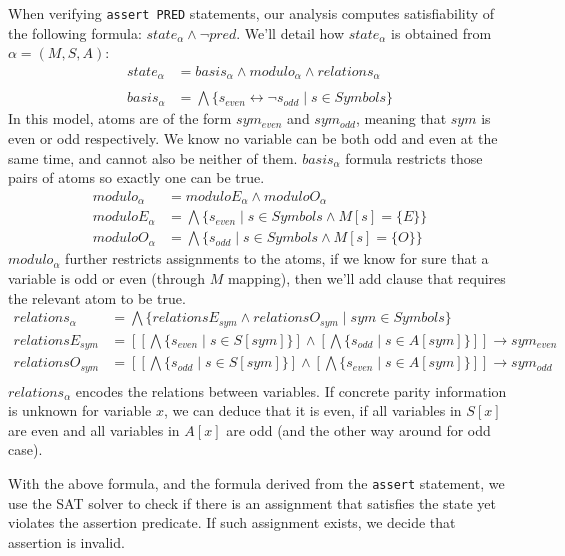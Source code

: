 When verifying \texttt{assert PRED} statements, our analysis computes satisfiability of the following formula: $state_\alpha\land\neg pred$. We'll detail how $state_\alpha$ is obtained from $\alpha = (M,S,A)$:
\begin{align*}
state_\alpha & = basis_\alpha \land modulo_\alpha \land relations_\alpha \\
\\
basis_\alpha &= \bigwedge\{s_{even}\leftrightarrow\neg s_{odd} \mid s \in Symbols\}
\end{align*}
In this model, atoms are of the form $sym_{even}$ and $sym_{odd}$, meaning that $sym$ is even or odd respectively. We know no variable can be both odd and even at the same time, and cannot also be neither of them. $basis_\alpha$ formula restricts those pairs of atoms so exactly one can be true.
\begin{align*}
modulo_\alpha &= moduloE_\alpha \land moduloO_\alpha \\
moduloE_\alpha &= \bigwedge\{s_{even} \mid s \in Symbols \land M[s] = \{E\}\} \\
moduloO_\alpha &= \bigwedge\{s_{odd} \mid s \in Symbols \land M[s] = \{O\}\}
\end{align*}
$modulo_\alpha$ further restricts assignments to the atoms, if we know for sure that a variable is odd or even (through $M$ mapping), then we'll add clause that requires the relevant atom to be true.
\begin{align*}
relations_\alpha &= \bigwedge \{relationsE_{sym} \land relationsO_{sym}  \mid sym \in Symbols\} \\
relationsE_{sym} &= \left[
	\left[
		\bigwedge \{s_{even} \mid s \in S[sym]\}
	\right] \land  \left[
		\bigwedge \{s_{odd} \mid s \in A[sym]\}
	\right]
\right]
\rightarrow sym_{even} \\
relationsO_{sym} &= \left[
	\left[
		\bigwedge \{s_{odd} \mid s \in S[sym]\}
	\right] \land  \left[
		\bigwedge \{s_{even} \mid s \in A[sym]\}
	\right]
\right]
\rightarrow sym_{odd} \\
\end{align*}
$relations_\alpha$ encodes the relations between variables. If concrete parity information is unknown for variable $x$, we can deduce that it is even, if all variables in $S[x]$ are even and all variables in $A[x]$ are odd (and the other way around for odd case).


With the above formula, and the formula derived from the \texttt{assert} statement, we use the SAT solver to check if there is an assignment that satisfies the state yet violates the assertion predicate. If such assignment exists, we decide that assertion is invalid.